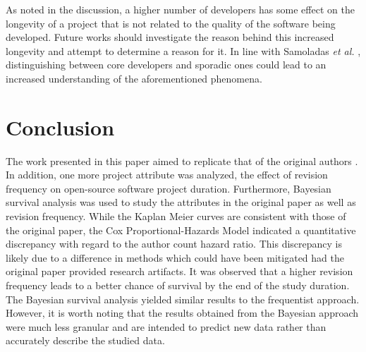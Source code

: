\documentclass[sigconf,review]{acmart}
\begin{document}
As noted in the discussion, a higher number of developers has some effect on the longevity of a project that is not related to the quality of the software being developed. 
Future works should investigate the reason behind this increased longevity and attempt to determine a reason for it. 
In line with Samoladas \emph{et al.} \cite{samoladas2010survival}, distinguishing between core developers and sporadic ones could lead to an increased understanding of the aforementioned phenomena. 

\section{Conclusion} \label{conclusion}

The work presented in this paper aimed to replicate that of the original authors \cite{ali2020cheating}. In addition, one more project attribute was analyzed, the effect of revision frequency on open-source software project duration.
Furthermore, Bayesian survival analysis was used to study the attributes in the original paper as well as revision frequency.
While the Kaplan Meier curves are consistent with those of the original paper, the Cox Proportional-Hazards Model indicated a quantitative discrepancy with regard to the author count hazard ratio.
This discrepancy is likely due to a difference in methods which could have been mitigated had the original paper provided research artifacts.
It was observed that a higher revision frequency leads to a better chance of survival by the end of the study duration. 
The Bayesian survival analysis yielded similar results to the frequentist approach.
However, it is worth noting that the results obtained from the Bayesian approach were much less granular and are intended to predict new data rather than accurately describe the studied data.
\balance


\end{document}
